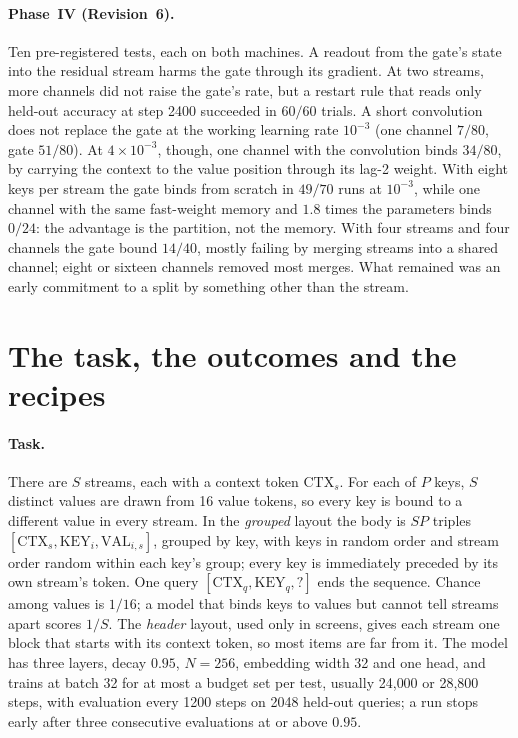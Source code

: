\documentclass[11pt]{article}
\begin{document}
\paragraph{Phase~IV (Revision~6).} Ten pre-registered tests, each on both machines. A readout from the gate's state into the residual stream harms the gate through its gradient. At two streams, more channels did not raise the gate's rate, but a restart rule that reads only held-out accuracy at step 2400 succeeded in $60/60$ trials. A short convolution does not replace the gate at the working learning rate $10^{-3}$ (one channel $7/80$, gate $51/80$). At $4\times10^{-3}$, though, one channel with the convolution binds $34/80$, by carrying the context to the value position through its lag-2 weight. With eight keys per stream the gate binds from scratch in $49/70$ runs at $10^{-3}$, while one channel with the same fast-weight memory and $1.8$ times the parameters binds $0/24$: the advantage is the partition, not the memory. With four streams and four channels the gate bound $14/40$, mostly failing by merging streams into a shared channel; eight or sixteen channels removed most merges. What remained was an early commitment to a split by something other than the stream.

\section{The task, the outcomes and the recipes}
\label{sec:task}

\paragraph{Task.} There are $S$ streams, each with a context token $\mathrm{CTX}_s$. For each of $P$ keys, $S$ distinct values are drawn from 16 value tokens, so every key is bound to a different value in every stream. In the \emph{grouped} layout the body is $S P$ triples $[\mathrm{CTX}_s, \mathrm{KEY}_i, \mathrm{VAL}_{i,s}]$, grouped by key, with keys in random order and stream order random within each key's group; every key is immediately preceded by its own stream's token. One query $[\mathrm{CTX}_q, \mathrm{KEY}_q, ?]$ ends the sequence. Chance among values is $1/16$; a model that binds keys to values but cannot tell streams apart scores $1/S$. The \emph{header} layout, used only in screens, gives each stream one block that starts with its context token, so most items are far from it. The model has three layers, decay $0.95$, $N = 256$, embedding width 32 and one head, and trains at batch 32 for at most a budget set per test, usually 24{,}000 or 28{,}800 steps, with evaluation every 1200 steps on 2048 held-out queries; a run stops early after three consecutive evaluations at or above $0.95$.
\end{document}
